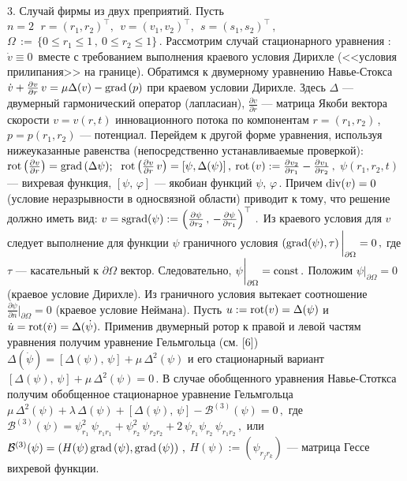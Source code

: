 3. Случай фирмы из двух преприятий. Пусть
 $
n=2\, \ \ r=\left(r_1, r_2\right)^\top, \ \ v=\left(v_1,
v_2\right)^\top, \ \ s=\left(s_1,s_2\right)^\top\,,
 $
 $
\Omega\,:= \,  \{0 \le r_1 \le 1\,, \ 0 \le r_2 \le 1\}\,.
 $
Рассмотрим случай стационарного уравнения :\ $\dot v \equiv 0$\,
вместе с  требованием выполнения краевого условия Дирихле (<<условия
прилипания>> на границе). Обратимся к двумерному уравнению
Навье-Стокса
  $
\dot v + \frac{\partial v}{\partial r}\,v = \mu\Delta (v) - {\rm
grad}\,(p)
  $
при краевом условии Дирихле. Здесь $\Delta$ --- двумерный
гармонический оператор (лапласиан), $\frac{\partial v}{\partial r}$
--- матрица Якоби вектора скорости $v=v(r,t)$ инновационного
потока по компонентам $r=(r_1,r_2)$\,, \ $p=p(r_1,r_2)$ ---
потенциал. Перейдем к другой форме уравнения, используя
нижеуказанные равенства (непосредственно устанавливаемые проверкой):
  $
{\rm rot}\left(\frac{\partial v}{\partial r}\right)={\rm
grad}\,(\Delta \psi);
 $
 $ \ {\rm rot}\left(\frac{\partial
v}{\partial r}\, v\right)=[\psi,\Delta (\psi)]\,,
  $
$ {\rm rot}\,(v) := \frac{\partial v_2}{\partial r_1}-\frac{\partial
v_1}{\partial r_2}\,, $ $\psi (r_1,r_2,t)$ --- вихревая функция,
$[\psi,\,\varphi]$ --- якобиан функций $\psi,\,\varphi$\,. Причем $
{\rm div}(v) =0 $ (условие неразрывности в односвязной области)
приводит к тому, что решение должно иметь вид:
 $
v = {\rm sgrad}(\psi) := \left(\frac{\partial\psi}{\partial
r_2}\,,\,-\frac{\partial\psi}{\partial r_1}\right)^\top\,.
 $
Из краевого условия для $v$ следует выполнение для функции $\psi$
граничного условия
  $
({\rm grad}(\psi),\tau)\,\bigg |_{\partial \Omega} = 0\,,
  $
где $\tau$ --- касательный к $\partial \Omega$ вектор.
Следовательно, $ \psi\bigg |_{\partial \Omega} = {\rm const}\,.$
Положим
 $
\psi\bigg |_{\partial \Omega} = 0\,
 $
(краевое условие Дирихле). Из граничного условия вытекает
соотношение
 $
\frac{\partial \psi}{\partial n}\bigg |_{\partial \Omega} = 0
  $
(краевое условие Неймана). Пусть $ u := {\rm rot}(v) = \Delta(\psi)$
и $ \dot u = {\rm rot}(\dot{v})=\Delta(\dot\psi). $ Применив
двумерный ротор к правой и левой частям уравнения получим уравнение
Гельмгольца (см. [6])
 $
\Delta(\dot\psi) = [\Delta(\psi),\,\psi] + \mu\,\Delta^2(\psi)
 $
и его стационарный вариант
 $
[\Delta(\psi),\,\psi] + \mu\,\Delta^2(\psi) = 0 \,.
 $
В случае обобщенного уравнения Навье-Стоткса  получим обобщенное
стационарное уравнение Гельмгольца
 $
\mu\,\Delta^2(\psi) + \lambda\,\Delta(\psi) + [\Delta(\psi),\,\psi]
- \mathcal{B}^{(3)}(\psi) = 0 \,,
 $
где
 $
\mathcal{B}^{(3)}(\psi) = \psi_{r_1}^2\,\psi_{r_1r_1}+
\psi_{r_2}^2\,\psi_{r_2r_2}+
2\,\psi_{r_1}\psi_{r_2}\,\psi_{r_1r_2}\,,
 $ или
 $
\mathcal{B}^{(3)}(\psi)= \left(H(\psi)\,{\rm grad}\,(\psi) , {\rm
grad}\,(\psi)\right)\,,
 $
$H(\psi):= (\psi_{r_jr_k})$ --- матрица Гессе вихревой функции.


